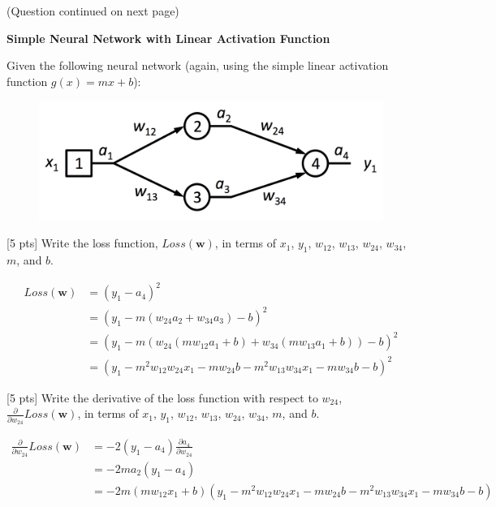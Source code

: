 (Question continued on next page)

\newpage
\textbf{Simple Neural Network with Linear Activation Function}

Given the following neural network (again, using the simple linear activation function $g(x) = mx + b$):

\begin{figure}[h]
\centering
\includegraphics[width=0.4\linewidth]{figs/NN_2.png}
\end{figure}

\begin{question}{[5 pts]}
Write the loss function, $Loss(\boldsymbol{w})$, in terms of $x_1$, $y_1$, $w_{12}$, $w_{13}$, $w_{24}$, $w_{34}$, $m$, and $b$.

\begin{minipage}{\textwidth}
    \solution{} {\begin{align*}
    Loss(\boldsymbol{w}) &= (y_1-a_4)^2\\
    &= (y_1-m(w_{24}a_2+w_{34}a_3)-b)^2\\
    &= (y_1-m(w_{24}(mw_{12}a_1+b)+w_{34}(mw_{13}a_1+b))-b)^2\\
    &= (y_1-m^2w_{12}w_{24}x_1-mw_{24}b-m^2w_{13}w_{34}x_1-mw_{34}b-b)^2
    \end{align*}
    }
\end{minipage}

\end{question}

\begin{question}{[5 pts]}
Write the derivative of the loss function with respect to $w_{24}$, $\frac{\partial}{\partial w_{24}} Loss(\boldsymbol{w})$, in terms of $x_1$, $y_1$, $w_{12}$, $w_{13}$, $w_{24}$, $w_{34}$, $m$, and $b$.

\begin{minipage}{\textwidth}
    \solution{} {\begin{align*}
    \frac{\partial}{\partial w_{24}}Loss(\boldsymbol{w}) &= -2(y_1-a_4)\frac{\partial a_4}{\partial w_{24}}\\
    &= -2ma_2(y_1-a_4)\\
    &= -2m(mw_{12}x_1+b)(y_1-m^2w_{12}w_{24}x_1-mw_{24}b-m^2w_{13}w_{34}x_1-mw_{34}b-b)
    \end{align*}
    }
\end{minipage}

\end{question}

